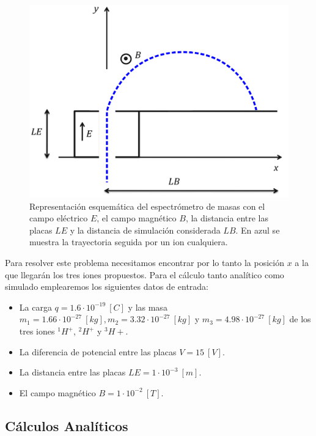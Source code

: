 \documentclass[journal]{IEEEtran}
\begin{document}
\begin{figure}[!htb]
    \includegraphics[width=\linewidth]{espectrometro.png}
    \caption{Representación esquemática del espectrómetro de masas con el campo eléctrico $E$, el campo magnético $B$, la distancia entre las placas $LE$ y la distancia de simulación considerada $LB$. En azul se muestra la trayectoria seguida por un ion cualquiera.}
    \label{fig:espetrometro}
\end{figure}

Para resolver este problema necesitamos encontrar por lo tanto la posición $x$ a la que llegarán los tres iones propuestos. Para el cálculo tanto analítico como simulado emplearemos los siguientes datos de entrada:

\begin{itemize}
    \item La carga $q = 1.6\cdot10^{-19}~[C]$ y las masa $m_1 = 1.66\cdot10^{-27}~[kg], m_2 = 3.32\cdot10^{-27}~[kg]$ y $m_3 = 4.98\cdot10^{-27}~[kg]$ de los tres iones $^1H^+$, $^2H^+$ y $^3H+$.
    \item La diferencia de potencial entre las placas $V = 15~[V]$.
    \item La distancia entre las placas $LE = 1\cdot 10^{-3}~[m]$.
    \item El campo magnético $B = 1\cdot10^{-2}~[T]$.
\end{itemize}

\subsection{Cálculos Analíticos}
\end{document}

